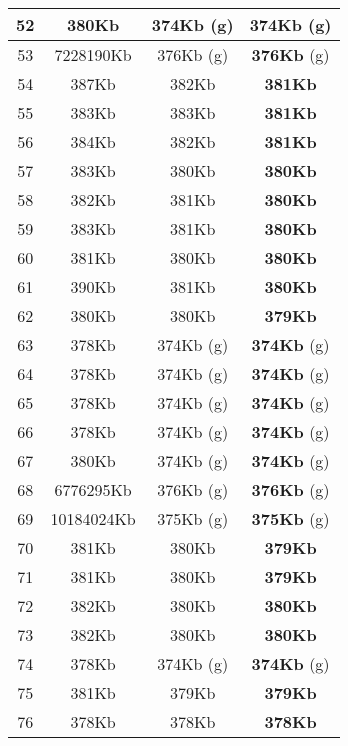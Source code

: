 \begin{table}[H]
\begin{minipage}{5cm}
{\begin{tabular}{|c|c|c|c|}
\hline
52 & 380Kb & 374Kb (g) & \textbf{374Kb} (g) \\
\hline
53 & 7228190Kb & 376Kb (g) & \textbf{376Kb} (g) \\
\hline
54 & 387Kb & 382Kb & \textbf{381Kb} \\
\hline
55 & 383Kb & 383Kb & \textbf{381Kb} \\
\hline
56 & 384Kb & 382Kb & \textbf{381Kb} \\
\hline
57 & 383Kb & 380Kb & \textbf{380Kb} \\
\hline
58 & 382Kb & 381Kb & \textbf{380Kb} \\
\hline
59 & 383Kb & 381Kb & \textbf{380Kb} \\
\hline
60 & 381Kb & 380Kb & \textbf{380Kb} \\
\hline
61 & 390Kb & 381Kb & \textbf{380Kb} \\
\hline
62 & 380Kb & 380Kb & \textbf{379Kb} \\
\hline
63 & 378Kb & 374Kb (g) & \textbf{374Kb} (g) \\
\hline
64 & 378Kb & 374Kb (g) & \textbf{374Kb} (g) \\
\hline
65 & 378Kb & 374Kb (g) & \textbf{374Kb} (g) \\
\hline
66 & 378Kb & 374Kb (g) & \textbf{374Kb} (g) \\
\hline
67 & 380Kb & 374Kb (g) & \textbf{374Kb} (g) \\
\hline
68 & 6776295Kb & 376Kb (g) & \textbf{376Kb} (g) \\
\hline
69 & 10184024Kb & 375Kb (g) & \textbf{375Kb} (g) \\
\hline
70 & 381Kb & 380Kb & \textbf{379Kb} \\
\hline
71 & 381Kb & 380Kb & \textbf{379Kb} \\
\hline
72 & 382Kb & 380Kb & \textbf{380Kb} \\
\hline
73 & 382Kb & 380Kb & \textbf{380Kb} \\
\hline
74 & 378Kb & 374Kb (g) & \textbf{374Kb} (g) \\
\hline
75 & 381Kb & 379Kb & \textbf{379Kb} \\
\hline
76 & 378Kb & 378Kb & \textbf{378Kb} \\
\hline
\end{tabular}
}
\end{minipage}
\begin{minipage}{5cm} 
\end{minipage}
\end{table}
